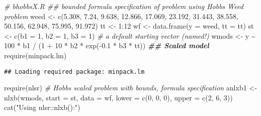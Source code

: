 \documentclass[
]{article}
\newenvironment{Shaded}{\begin{snugshade}}{\end{snugshade}}
\newcommand{\AttributeTok}[1]{\textcolor[rgb]{0.77,0.63,0.00}{#1}}
\newcommand{\CommentTok}[1]{\textcolor[rgb]{0.56,0.35,0.01}{\textit{#1}}}
\newcommand{\DecValTok}[1]{\textcolor[rgb]{0.00,0.00,0.81}{#1}}
\newcommand{\DocumentationTok}[1]{\textcolor[rgb]{0.56,0.35,0.01}{\textbf{\textit{#1}}}}
\newcommand{\FloatTok}[1]{\textcolor[rgb]{0.00,0.00,0.81}{#1}}
\newcommand{\FunctionTok}[1]{\textcolor[rgb]{0.00,0.00,0.00}{#1}}
\newcommand{\NormalTok}[1]{#1}
\newcommand{\OtherTok}[1]{\textcolor[rgb]{0.56,0.35,0.01}{#1}}
\newcommand{\SpecialCharTok}[1]{\textcolor[rgb]{0.00,0.00,0.00}{#1}}
\newcommand{\StringTok}[1]{\textcolor[rgb]{0.31,0.60,0.02}{#1}}
\begin{document}
\begin{Shaded}
\begin{Highlighting}[]
\CommentTok{\# bhobbsX.R \#\# bounded formula specification of problem using Hobbs Weed problem}
\NormalTok{weed }\OtherTok{\textless{}{-}} \FunctionTok{c}\NormalTok{(}\FloatTok{5.308}\NormalTok{, }\FloatTok{7.24}\NormalTok{, }\FloatTok{9.638}\NormalTok{, }\FloatTok{12.866}\NormalTok{, }\FloatTok{17.069}\NormalTok{, }\FloatTok{23.192}\NormalTok{, }\FloatTok{31.443}\NormalTok{,}
          \FloatTok{38.558}\NormalTok{, }\FloatTok{50.156}\NormalTok{, }\FloatTok{62.948}\NormalTok{, }\FloatTok{75.995}\NormalTok{, }\FloatTok{91.972}\NormalTok{)}
\NormalTok{tt }\OtherTok{\textless{}{-}} \DecValTok{1}\SpecialCharTok{:}\DecValTok{12}
\NormalTok{wf }\OtherTok{\textless{}{-}} \FunctionTok{data.frame}\NormalTok{(}\AttributeTok{y =}\NormalTok{ weed, }\AttributeTok{tt =}\NormalTok{ tt)}
\NormalTok{st }\OtherTok{\textless{}{-}} \FunctionTok{c}\NormalTok{(}\AttributeTok{b1 =} \DecValTok{1}\NormalTok{, }\AttributeTok{b2 =} \DecValTok{1}\NormalTok{, }\AttributeTok{b3 =} \DecValTok{1}\NormalTok{) }\CommentTok{\# a default starting vector (named!)}
\NormalTok{wmods }\OtherTok{\textless{}{-}}\NormalTok{ y }\SpecialCharTok{\textasciitilde{}} \DecValTok{100} \SpecialCharTok{*}\NormalTok{ b1 }\SpecialCharTok{/}\NormalTok{ (}\DecValTok{1} \SpecialCharTok{+} \DecValTok{10} \SpecialCharTok{*}\NormalTok{ b2 }\SpecialCharTok{*} \FunctionTok{exp}\NormalTok{(}\SpecialCharTok{{-}}\FloatTok{0.1} \SpecialCharTok{*}\NormalTok{ b3 }\SpecialCharTok{*}\NormalTok{ tt)) }\DocumentationTok{\#\# Scaled model}
\FunctionTok{require}\NormalTok{(minpack.lm)}
\end{Highlighting}
\end{Shaded}

\begin{verbatim}
## Loading required package: minpack.lm
\end{verbatim}

\begin{Shaded}
\begin{Highlighting}[]
\FunctionTok{require}\NormalTok{(nlsr)}
\CommentTok{\# Hobbs scaled problem with bounds, formula specification}
\NormalTok{anlxb1 }\OtherTok{\textless{}{-}} \FunctionTok{nlxb}\NormalTok{(wmods, }\AttributeTok{start =}\NormalTok{ st, }\AttributeTok{data =}\NormalTok{ wf, }\AttributeTok{lower =} \FunctionTok{c}\NormalTok{(}\DecValTok{0}\NormalTok{, }\DecValTok{0}\NormalTok{, }\DecValTok{0}\NormalTok{), }\AttributeTok{upper =} \FunctionTok{c}\NormalTok{(}\DecValTok{2}\NormalTok{, }\DecValTok{6}\NormalTok{, }\DecValTok{3}\NormalTok{))}
\FunctionTok{cat}\NormalTok{(}\StringTok{"Using nlsr::nlxb():"}\NormalTok{)}
\end{Highlighting}
\end{Shaded}
\end{document}
